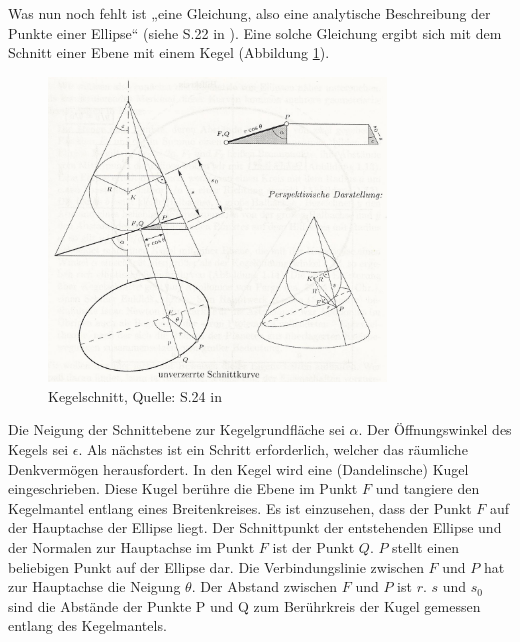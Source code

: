 Was nun noch fehlt ist „eine Gleichung, also eine analytische Beschreibung der Punkte einer Ellipse“ (siehe S.22 in \cite{Raumflugm}). Eine solche Gleichung ergibt sich mit dem Schnitt einer Ebene mit einem Kegel (Abbildung \ref{fig:kegelsch_1}). 
\begin{figure}[h]                                                                           %
	\centering                                                                            	%
	\includegraphics[width=0.8\textwidth]{./images/keplers_law1.jpg}                        %
	\caption[Kegelschnitt]{Kegelschnitt, Quelle: S.24 in \cite{Raumflugm}}                  %
	\label{fig:kegelsch_1}                                                                  %
\end{figure}                                                                              	%
Die Neigung der Schnittebene zur Kegelgrundfläche sei \ensuremath{\alpha}. Der Öffnungswinkel des Kegels sei \ensuremath{\epsilon}. Als nächstes ist ein Schritt erforderlich, welcher das räumliche Denkvermögen herausfordert. In den Kegel wird eine (Dandelinsche) Kugel eingeschrieben. Diese Kugel berühre die Ebene im Punkt \ensuremath{F} und tangiere den Kegelmantel entlang eines Breitenkreises. Es ist einzusehen, dass der Punkt \ensuremath{F} auf der Hauptachse der Ellipse liegt. Der Schnittpunkt der entstehenden Ellipse und der Normalen zur Hauptachse im Punkt \ensuremath{F} ist der Punkt \ensuremath{Q}. \ensuremath{P} stellt einen beliebigen Punkt auf der Ellipse dar. Die Verbindungslinie zwischen \ensuremath{F} und \ensuremath{P} hat zur Hauptachse die Neigung \ensuremath{\theta}. Der Abstand zwischen \ensuremath{F} und \ensuremath{P} ist \ensuremath{r}. \ensuremath{s} und \ensuremath{s_0} sind die Abstände der Punkte P und Q zum Berührkreis der Kugel gemessen entlang des Kegelmantels. 

